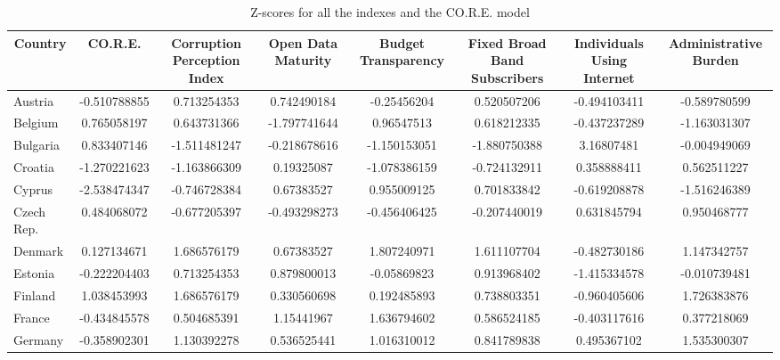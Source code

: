 \documentclass[a4paper, twoside]{report}
\begin{document}
\begin{table}[htbp]
  \centering
\caption{Z-scores for all the indexes and the CO.R.E. model}
   \tabcolsep=0.60cm
	\renewcommand{\arraystretch}{1.8}
	\begin{adjustbox}{max width=\linewidth}
    \begin{tabular}{lccccccc}
    \toprule
    \multicolumn{1}{c}{\textbf{Country}} & \textbf{CO.R.E.} & \multicolumn{1}{p{15em}}{\textbf{\hfil Corruption Perception Index}} & \multicolumn{1}{p{11em}}{\textbf{\hfil Open Data Maturity}} & \multicolumn{1}{p{12em}}{\textbf{\hfil Budget Transparency}} & \multicolumn{1}{p{17em}}{\textbf{\hfil Fixed Broad Band Subscribers}} & \multicolumn{1}{p{15em}}{\textbf{\hfil Individuals Using Internet}} & \multicolumn{1}{p{12em}}{\textbf{\hfil Administrative Burden}} \\
    \midrule 
    Austria & -0.510788855 & 0.713254353 & 0.742490184 & -0.25456204 & 0.520507206 & -0.494103411 & -0.589780599 \\
    Belgium & 0.765058197 & 0.643731366 & -1.797741644 & 0.96547513 & 0.618212335 & -0.437237289 & -1.163031307 \\
    Bulgaria & 0.833407146 & -1.511481247 & -0.218678616 & -1.150153051 & -1.880750388 & 3.16807481 & -0.004949069 \\
    Croatia & -1.270221623 & -1.163866309 & 0.19325087 & -1.078386159 & -0.724132911 & 0.358888411 & 0.562511227 \\
    Cyprus & -2.538474347 & -0.746728384 & 0.67383527 & 0.955009125 & 0.701833842 & -0.619208878 & -1.516246389 \\
    Czech Rep. & 0.484068072 & -0.677205397 & -0.493298273 & -0.456406425 & -0.207440019 & 0.631845794 & 0.950468777 \\
    Denmark & 0.127134671 & 1.686576179 & 0.67383527 & 1.807240971 & 1.611107704 & -0.482730186 & 1.147342757 \\
    Estonia & -0.222204403 & 0.713254353 & 0.879800013 & -0.05869823 & 0.913968402 & -1.415334578 & -0.010739481 \\
    Finland & 1.038453993 & 1.686576179 & 0.330560698 & 0.192485893 & 0.738803351 & -0.960405606 & 1.726383876 \\
    France & -0.434845578 & 0.504685391 & 1.15441967 & 1.636794602 & 0.586524185 & -0.403117616 & 0.377218069 \\
    Germany & -0.358902301 & 1.130392278 & 0.536525441 & 1.016310012 & 0.841789838 & 0.495367102 & 1.535300307 \\

\end{tabular}
\end{adjustbox}
\end{table}
\end{document}
